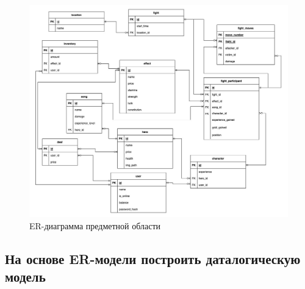 
\begin{figure}[H]
	\begin{center}
		\includegraphics[scale=0.46]{images/ER.jpg}
		\caption{ER-диаграмма предметной области}
	\end{center}
\end{figure}

\subsection*{На основе ER-модели построить даталогическую модель}


